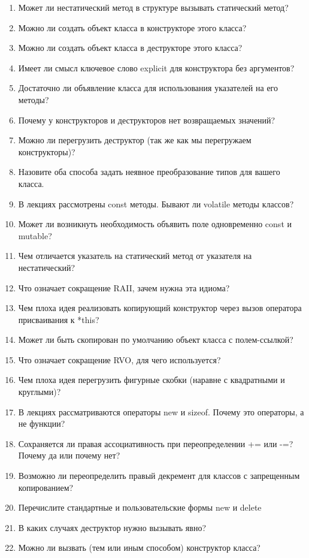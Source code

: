 \documentclass[a4paper,12pt,oneside]{book}
\begin{document}
\begin{enumerate}
\item Может ли нестатический метод в структуре вызывать статический метод?
\item Можно ли создать объект класса в конструкторе этого класса?
\item Можно ли создать объект класса в деструкторе этого класса?
\item Имеет ли смысл ключевое слово explicit для конструктора без аргументов?
\item Достаточно ли объявление класса для использования указателей на его методы?
\item Почему у конструкторов и деструкторов нет возвращаемых значений?
\item Можно ли перегрузить деструктор (так же как мы перегружаем конструкторы)?
\item Назовите оба способа задать неявное преобразование типов для вашего класса.
\item В лекциях рассмотрены const методы. Бывают ли volatile методы классов?
\item Может ли возникнуть необходимость объявить поле одновременно const и mutable?
\item Чем отличается указатель на статический метод от указателя на нестатический?
\item Что означает сокращение RAII, зачем нужна эта идиома?
\item Чем плоха идея реализовать копирующий конструктор через вызов оператора присваивания к *this?
\item Может ли быть скопирован по умолчанию объект класса с полем-ссылкой?
\item Что означает сокращение RVO, для чего используется?
\item Чем плоха идея перегрузить фигурные скобки (наравне с квадратными и круглыми)?
\item В лекциях рассматриваются операторы new и sizeof. Почему это операторы, а не функции?
\item Сохраняется ли правая ассоциативность при переопределении += или -=? Почему да или почему нет?
\item Возможно ли переопределить правый декремент для классов с запрещенным копированием?
\item Перечислите стандартные и пользовательские формы new и delete
\item В каких случаях деструктор нужно вызывать явно?
\item Можно ли вызвать (тем или иным способом) конструктор класса?

\end{enumerate}
\end{document}
